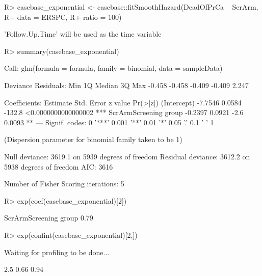 \documentclass[article]{jss}
\begin{document}
\begin{CodeChunk}

\begin{CodeInput}
R> casebase_exponential <- casebase::fitSmoothHazard(DeadOfPrCa ~ ScrArm, 
R+                                                   data = ERSPC, 
R+                                                   ratio = 100)
\end{CodeInput}

\begin{CodeOutput}
'Follow.Up.Time' will be used as the time variable
\end{CodeOutput}

\begin{CodeInput}
R> summary(casebase_exponential)
\end{CodeInput}

\begin{CodeOutput}

Call:
glm(formula = formula, family = binomial, data = sampleData)

Deviance Residuals: 
   Min      1Q  Median      3Q     Max  
-0.458  -0.458  -0.409  -0.409   2.247  

Coefficients:
                      Estimate Std. Error z value            Pr(>|z|)    
(Intercept)            -7.7546     0.0584  -132.8 <0.0000000000000002 ***
ScrArmScreening group  -0.2397     0.0921    -2.6              0.0093 ** 
---
Signif. codes:  0 '***' 0.001 '**' 0.01 '*' 0.05 '.' 0.1 ' ' 1

(Dispersion parameter for binomial family taken to be 1)

    Null deviance: 3619.1  on 5939  degrees of freedom
Residual deviance: 3612.2  on 5938  degrees of freedom
AIC: 3616

Number of Fisher Scoring iterations: 5
\end{CodeOutput}

\begin{CodeInput}
R> exp(coef(casebase_exponential)[2])
\end{CodeInput}

\begin{CodeOutput}
ScrArmScreening group 
                 0.79 
\end{CodeOutput}

\begin{CodeInput}
R> exp(confint(casebase_exponential)[2,])
\end{CodeInput}

\begin{CodeOutput}
Waiting for profiling to be done...
\end{CodeOutput}

\begin{CodeOutput}
 2.5 %
  0.66   0.94 
\end{CodeOutput}
\end{CodeChunk}
\end{document}
